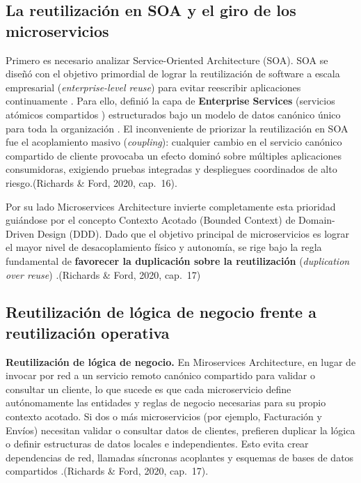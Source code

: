 \documentclass[12pt,a4paper]{article}
\begin{document}
\subsection{La reutilización en SOA y el giro de los microservicios}


Primero es necesario analizar   Service-Oriented Architecture (SOA). SOA se diseñó con el objetivo primordial de lograr la reutilización de software a escala empresarial (\textit{enterprise-level reuse}) para evitar reescribir aplicaciones continuamente . Para ello, definió la capa de \textbf{Enterprise Services} (servicios atómicos compartidos ) estructurados bajo un modelo de datos canónico único para toda la organización . El inconveniente de priorizar la reutilización en SOA fue el acoplamiento masivo (\textit{coupling}): cualquier cambio en el servicio canónico compartido de cliente provocaba un efecto dominó sobre múltiples aplicaciones consumidoras, exigiendo pruebas integradas y despliegues coordinados de alto riesgo.(Richards \& Ford, 2020, cap.~16).

Por su lado Microservices Architecture  invierte completamente esta prioridad guiándose por el concepto Contexto Acotado (Bounded Context) de Domain-Driven Design (DDD). Dado que el objetivo principal de microservicios es lograr el mayor nivel de desacoplamiento físico y autonomía, se rige bajo la regla fundamental de \textbf{favorecer la duplicación sobre la reutilización} (\textit{duplication over reuse}) .(Richards \& Ford, 2020, cap.~17)

\subsection{Reutilización de lógica de negocio frente a reutilización operativa}


\textbf{Reutilización de lógica de negocio.} En Miroservices Architecture, en lugar de invocar por red a un servicio remoto canónico compartido para validar o consultar un cliente, lo que sucede es que cada microservicio define autónomamente las entidades y reglas de negocio necesarias para su propio contexto acotado.
Si dos o más microservicios (por ejemplo, Facturación y Envíos) necesitan validar o consultar datos de clientes, prefieren duplicar la lógica o definir estructuras de datos locales e independientes. Esto evita crear dependencias de red, llamadas síncronas acoplantes y esquemas de bases de datos compartidos .(Richards \& Ford, 2020, cap.~17).
\end{document}
